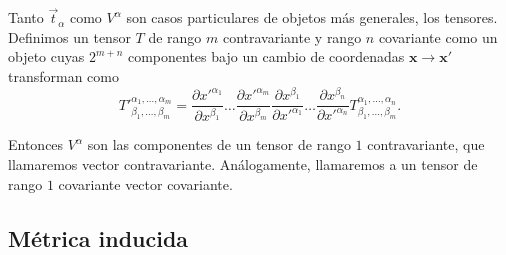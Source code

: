 Tanto $\vec{t}_{\alpha}$ como $V^{\alpha}$ son casos particulares de objetos
más generales, los tensores. Definimos un tensor $T$ de rango $m$
contravariante y rango $n$ covariante como un objeto cuyas $2^{m+n}$ componentes
bajo un cambio de coordenadas $\mathbf{x}\rightarrow\mathbf{x'}$ transforman
como 
\begin{equation*}
T'^{\alpha_1,\dots,\alpha_m}_{\beta_1,\dots,\beta_m}=
\frac{\partial x'^{\alpha_1}}{\partial x^{\beta_1}}\dots \frac{\partial
  x'^{\alpha_m}}{\partial x^{\beta_m}}
\frac{\partial x^{\beta_1}}{\partial x'^{\alpha_1}}\dots \frac{\partial
  x^{\beta_n}}{\partial x'^{\alpha_n}}T^{\alpha_1,\dots,\alpha_n}_{\beta_1,\dots,\beta_m}.
\end{equation*}

Entonces $V^{\alpha}$ son las componentes de un tensor de rango $1$
contravariante, que llamaremos vector contravariante. Análogamente,
llamaremos a un tensor de rango $1$ covariante vector covariante.
 
\subsection{Métrica inducida}

